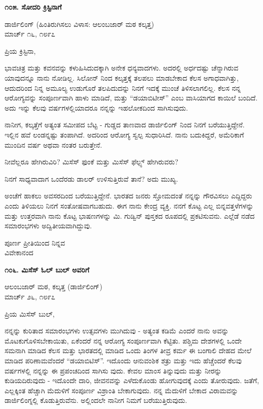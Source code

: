 \begin{center}
\textbf{೧೦೫. ಸೋದರಿ ಕ್ರಿಸ್ಟಿನಾಗೆ}
\end{center}

\begin{flushright}
ಡಾರ್ಜಿಲಿಂಗ್ (ಹಿಂತಿರುಗಿಸಲು ವಿಳಾಸ: ಆಲಂಬಜಾರ್ ಮಠ ಕಲ್ಕತ್ತ)\\ಮಾರ್ಚ್ ೧೬, ೧೮೯೭
\end{flushright}

ಪ್ರಿಯ ಕ್ರಿಸ್ಟಿನಾ,

ಭಾವಚಿತ್ರ ಮತ್ತು ಕವನವನ್ನು ಕಳುಹಿಸಿದುದಕ್ಕಾಗಿ ಅನೇಕ ಧನ್ಯವಾದಗಳು. ಅದರಲ್ಲಿ ಅರ್ಧದಷ್ಟು ಚೆನ್ನಾಗಿರುವ ಯಾವುದನ್ನೂ ನಾನು ನೋಡಿಲ್ಲ. ಸಿಲೋನ್ ನಿಂದ ಕಲ್ಕತ್ತಕ್ಕೆ ತಲಪಲು ಮಾಡಬೇಕಾದ ಕೆಲಸ ಅಗಾಧವಾಗಿತ್ತು, ಆದುದರಿಂದ ನಿನ್ನ ಅಮೂಲ್ಯ ಉಡುಗೊರೆ ತಲಪಿದುದನ್ನು ನಿನಗೆ ಇದಕ್ಕೆ ಮುಂಚೆ ತಿಳಿಸಲಾಗಲಿಲ್ಲ. ಕೆಲಸ ನನ್ನ ಆರೋಗ್ಯವನ್ನು ಸಂಪೂರ್ಣವಾಗಿ ಹಾಳು ಮಾಡಿದೆ, ಮತ್ತು “ಡಯಾಬಿಟೀಸ್” ಎಂಬ ವಾಸಿಯಾಗದ ಕಾಯಿಲೆ ಬಂದಿದೆ. ಅದು ಇನ್ನು ಕೆಲವು ವರ್ಷಗಳಲ್ಲಿಯಾದರೂ ನನ್ನನ್ನು ಇಹಲೋಕದಿಂದ ಸಾಗಿಸುವುದು.

ನಾನೀಗ, ಕಲ್ಕತ್ತೆಗೆ ಅತ್ಯಂತ ಸಮೀಪದ ಬೆಟ್ಟ - ಗುಡ್ಡದ ತಾಣವಾದ ಡಾರ್ಜಿಲಿಂಗ್ ನಿಂದ ನಿನಗೆ ಬರೆಯುತ್ತಿದ್ದೇನೆ. ಇಲ್ಲಿನ ಹವೆ ಲಂಡನ್ನಷ್ಟು ತಂಪಾಗಿದೆ. ಅದರಿಂದ ಆರೋಗ್ಯ ಸ್ವಲ್ಪ ಸುಧಾರಿಸಿದೆ. ನಾನು ಬದುಕಿದ್ದರೆ, ಅಮೆರಿಕಾಗೆ ಮುಂದಿನ ವರ್ಷ ಅಥವಾ ನಂತರ ಬರುತ್ತೇನೆ.

ನೀವೆಲ್ಲರೂ ಹೇಗಿರುವಿರಿ? ಮಿಸೆಸ್ ಫುಂಕೆ ಮತ್ತು ಮಿಸೆಸ್ ಫೆಲ್ಪ್ಸ್ ಹೇಗಿರುವರು?

ನಿನಗೆ ಸಾಧ್ಯವಾದಾಗ ಒಂದೆರಡು ಡಾಲರ್ ಉಳಿಸುತ್ತಿರುವೆ ತಾನೆ? ಅದು ಮುಖ್ಯ.

ಅಂಚೆಗೆ ಹಾಕಲು ಅವಸರದಿಂದ ಬರೆಯುತ್ತಿದ್ದೇನೆ. ಭಾರತದ ಜನರು ಸ್ತೋಮದಂತೆ ನನ್ನನ್ನು ಗೌರವಿಸಲು ಎದ್ದಿದ್ದರು ಎಂದು ತಿಳಿಯಲು ನಿನಗೆ ಸಂತೋಷವಾಗಬಹುದು. ಈಗ ನಾನು ಕೇಂದ್ರ ವ್ಯಕ್ತಿ. ನನಗೆ ಕೊಟ್ಟ ಎಲ್ಲ ಬಿನ್ನವತ್ತಳೆಗಳನ್ನು ಮತ್ತು ಉತ್ತರವಾಗಿ ನಾನು ಕೊಟ್ಟ ಭಾಷಣಗಳನ್ನು ಮಿ. ಗುಡ್ವಿನ್ ಪುಸ್ತಕದ ರೂಪದಲ್ಲಿ ಪ್ರಕಟಿಸುವನು. ಎಲ್ಲೆಡೆ ನಡೆದ ಸಮಾರಂಭಗಳು ಅದ್ವಿತೀಯವಾಗಿದ್ದುವು.

\begin{flushright}
ಪೂರ್ಣ ಪ್ರೀತಿಯಿಂದ ನಿನ್ನವ\\ವಿವೇಕಾನಂದ
\end{flushright}

\begin{center}
\textbf{೧೦೬. ಮಿಸೆಸ್ ಓಲ್ ಬುಲ್ ಅವರಿಗೆ}
\end{center}

\begin{flushright}
ಆಲಂಬಜಾರ್ ಮಠ, ಕಲ್ಕತ್ತ (ಡಾರ್ಜಿಲಿಂಗ್)\\ಮಾರ್ಚ್ ೨೬, ೧೮೯೭
\end{flushright}

ಪ್ರಿಯ ಮಿಸೆಸ್ ಬುಲ್,

ನನ್ನನ್ನು ಕುರಿತಾದ ಸಮಾರಂಭಗಳು ಉತ್ಸವಗಳು ಮುಗಿದುವು - ಅತ್ಯಂತ ಕಡಿಮೆ ಎಂದರೆ ನಾನು ಅವನ್ನು ಮೊಟಕುಗೊಳಿಸಬೇಕಾಯಿತು, ಏಕೆಂದರೆ ನನ್ನ ಆರೋಗ್ಯ ಸಂಪೂರ್ಣವಾಗಿ ಕೆಟ್ಟಿತು. ಪಶ್ಚಿಮ ದೇಶಗಳಲ್ಲಿ ಒಂದೇ ಸಮನಾಗಿ ಮಾಡಿದ ಕೆಲಸ ಮತ್ತು ಭಾರತದಲ್ಲಿ ಮಾಡಿದ ಒಂದು ತಿಂಗಳ ತೀವ್ರ ಕರ್ಮ ಈ ಬಂಗಾಲಿ ದೇಹದ ಮೇಲೆ ಮಾಡಿದ ಪರಿಣಾಮವೆಂದರೆ “ಡಯಾಬಿಟಿಸ್”. ಇದೊಂದು ಆನುವಂಶಿಕ ಶತ್ರು ಮತ್ತು ಇದು ಹೆಚ್ಚೆಂದರೆ ಕೆಲವು ವರ್ಷಗಳಲ್ಲಿ ನನ್ನನ್ನು ಈ ಪ್ರಪಂಚದಿಂದ ಸಾಗಿಸು ವುದು. ಕೇವಲ ಮಾಂಸ ತಿನ್ನುವುದು ಮತ್ತು ನೀರನ್ನು ಕುಡಿಯದಿರುವುದು - ಇದೊಂದೇ ದಾರಿ, ಜೀವನವನ್ನು ಎಳೆದುಕೊಂಡು ಹೋಗುವುದಕ್ಕೆ ಎಂದು ತೋರುವುದು. ಜತೆಗೆ, ಎಲ್ಲಕ್ಕಿಂತ ಹೆಚ್ಚಾಗಿ ಮೆದುಳಿಗೆ ಸಂಪೂರ್ಣ ವಿಶ್ರಾಂತಿ ಬೇಕಾಗುವುದು. ನನ್ನ ಮೆದುಳಿಗೆ ಬೇಕಾದ ವಿರಾಮವನ್ನು ಡಾರ್ಜಿಲಿಂಗ್ನಲ್ಲಿ ಕೊಡುತ್ತಿರುವೆನು. ಅಲ್ಲಿಂದಲೇ ನಾನೀಗ ನಿಮಗೆ ಬರೆಯುತ್ತಿರುವುದು.

